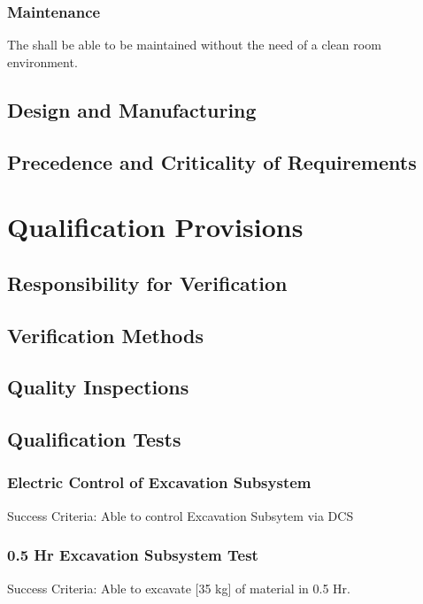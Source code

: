 \subsubsection{Maintenance }
\label{ref:Maintenance }
The  shall be able to be maintained without the need of a clean room environment.
\subsection{Design and Manufacturing}
\subsubsection{}
\label{ref:}

\subsection{Precedence and Criticality of Requirements}
\label{ref:}

\newpage
\section{Qualification Provisions}
\subsection{Responsibility for Verification}
\label{ref:}

\subsection{Verification Methods}
\label{ref:}

\subsection{Quality Inspections}
\label{ref:}

\subsection{Qualification Tests}
\subsubsection{Electric Control of Excavation Subsystem}
\label{ref:Electric Control of Excavation Subsystem}
Success Criteria: Able to control Excavation Subsytem via DCS
\subsubsection{0.5 Hr Excavation Subsystem Test}
\label{ref:0.5 Hr Excavation Subsystem Test}
Success Criteria: Able to excavate [35 kg] of material in 0.5 Hr. 
